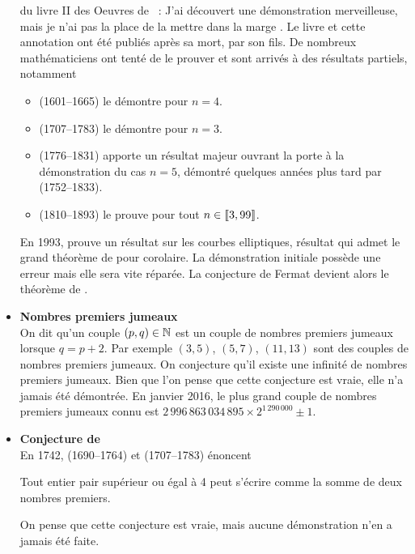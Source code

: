 \documentclass{magnolia}
\begin{document}
\begin{itemize}
  du livre {\sc II} des Oeuvres de ~: \og J'ai découvert une
  démonstration merveilleuse, mais je n'ai pas la place de la mettre dans la
  marge \fg. Le livre et cette annotation ont été publiés après sa mort, par son
  fils. De nombreux mathématiciens ont tenté de le prouver et sont arrivés
  à des résultats partiels, notamment
  \begin{itemize}
  \item {} (1601--1665) le démontre pour $n=4$.
  \item {} (1707--1783) le démontre pour $n=3$.
  \item {} (1776--1831) apporte un résultat majeur ouvrant la
    porte à la démonstration du cas $n=5$, démontré quelques années plus tard
    par  (1752--1833).
  \item {} (1810--1893) le prouve pour tout $n\in\left\llbracket 3,99\right\rrbracket$.
  \end{itemize}
  En 1993,  prouve un résultat sur les courbes elliptiques, résultat qui
  admet le grand théorème de  pour corolaire. La démonstration initiale
  possède une erreur mais elle sera vite réparée. La conjecture de Fermat
  devient alors le théorème de .
\item {\bf Nombres premiers jumeaux}\\
  On dit qu'un couple $(p,q)\in\mathbb{N}$ est un couple de nombres premiers jumeaux
  lorsque $q=p+2$. Par exemple $(3,5)$, $(5,7)$, $(11,13)$ sont des couples de
  nombres premiers jumeaux. On conjecture qu'il existe une infinité de nombres premiers jumeaux. Bien que l'on pense que cette conjecture est vraie,
  elle n'a jamais été démontrée.
  En janvier 2016, le plus grand couple de nombres premiers
  jumeaux connu est $2\,996\,863\,034\,895 \times 2^{1\,290\,000}\pm 1$.
\item {\bf Conjecture de }\\
  En 1742,  (1690--1764) et  (1707--1783) énoncent
  \medskip
  \begin{center}
  \og \parbox[t]{0.7\linewidth}{%
    Tout entier pair supérieur ou égal à 4 peut s'écrire comme la somme de
    deux nombres premiers.\fg}
  \end{center}
  \medskip
  On pense que cette conjecture est vraie, mais aucune démonstration n'en a jamais
  été faite.
\end{itemize}

\end{document}
